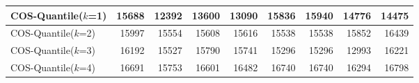 \begin{table*}[ht]
{\begin{tabular}{|l|r|r|r|r|r|r|r|r|}
        COS-Quantile($k$=1) & 15688  & 12392  & 13600  & 13090  & 15836  & 15940  & 14776  & 14475  \\ \hline
        COS-Quantile($k$=2) & 15997  & 15554  & 15608  & 15616  & 15538  & 15538  & 15852  & 16439  \\ \hline
        COS-Quantile($k$=3) & 16192  & 15527  & 15790  & 15741  & 15296  & 15296  & 12993  & 16221  \\ \hline
        COS-Quantile($k$=4) & 16691  & 15753  & 16601  & 16482  & 16740  & 16740  & 16294  & 16798  \\ \hline
    \end{tabular}
  }
\end{table*}
